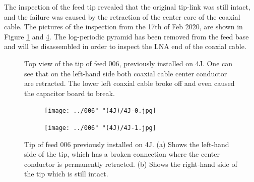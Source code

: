\documentclass[12pt,a4paper,oneside]{article}
\begin{document}
The inspection of the feed tip revealed that the original tip-link was still intact, and the failure was caused by the retraction of the center core of the coaxial cable.
The pictures of the inspection from the 17th of Feb 2020, are shown in Figure \ref{fig:inspect-020(0)}  and \ref{fig:inspect-020(1)}. The log-periodic pyramid has been removed from the feed base and will be disassembled in order to inspect the LNA end of the coaxial cable.

%
\begin{figure}[H]
\caption{Top view of the tip of feed 006, previously installed on 4J. One can see that on the left-hand side both coaxial cable center conductor are retracted. The lower left coaxial cable broke off and even caused the capacitor board to break.}
\label{fig:inspect-020(0)}
\end{figure}
%


\newpage
%
\begin{figure}[H]
   \thispagestyle{empty}
    \centering
        \begin{subfigure}[t]{0.92\textwidth}
        \centering
        \texttt{[image: ../006" "(4J)/4J-0.jpg]}
        \caption{}
        \label{fig:Tsys-1g}
   	 \end{subfigure}
   
   
        \begin{subfigure}[t]{0.92\textwidth}
        \centering
        \texttt{[image: ../006" "(4J)/4J-1.jpg]}
        \caption{}
        \label{fig:SpecX-1g}
   	 \end{subfigure}
    \caption{Tip of feed 006 previously installed on 4J. (a) Shows the left-hand side of the tip, which has a broken connection where the center conductor is permanently retracted. (b) Shows the right-hand side of the tip which is still intact. }
    \label{fig:inspect-020(1)}
\end{figure}
\end{document}
